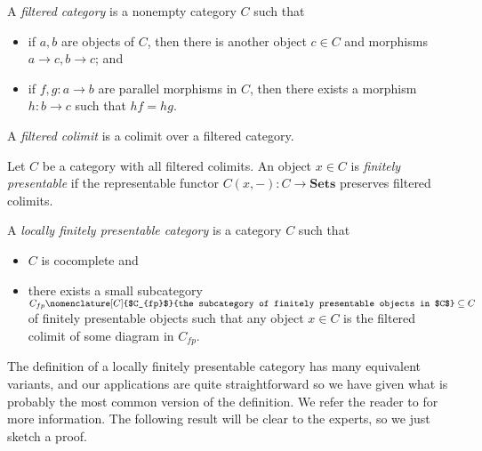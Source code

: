 \documentclass{amsbook} %
\newcommand{\cn}{\colon}
\newcommand{\mb}{\mathbf}
\numberwithin{section}{chapter}
\begin{document}
\begin{Defi}
A \textit{filtered category} is a nonempty category $C$ such that
\begin{itemize}
\item if $a,b$ are objects of $C$, then there is another object $c \in C$ and morphisms $a \to c, b \to c$; and
\item if $f,g \cn a \to b$ are parallel morphisms in $C$, then there exists a morphism $h \cn b \to c$ such that $hf = hg$.
\end{itemize}
\end{Defi}

\begin{Defi}
A \emph{filtered colimit} is a colimit over a filtered category.
\end{Defi}

\begin{Defi}
Let $C$ be a category with all filtered colimits.  An object $x \in C$ is \textit{finitely presentable} if the representable functor $C(x, -):C \rightarrow \mb{Sets}$ preserves filtered colimits.
\end{Defi}

\begin{Defi}
A \textit{locally finitely presentable category} is a category $C$ such that
\begin{itemize}
\item $C$ is cocomplete and
\item there exists a small subcategory $C_{fp}\nomenclature[C]{$C_{fp}$}{the subcategory of finitely presentable objects in $C$} \subseteq C$ of finitely presentable objects such that any object $x \in C$ is the filtered colimit of some diagram in $C_{fp}$.
\end{itemize}
\end{Defi}


The definition of a locally finitely presentable category has many equivalent variants, and our applications are quite straightforward so we have given what is probably the most common version of the definition.  We refer the reader to \cite{ar} for more information.  The following result will be clear to the experts, so we just sketch a proof.
\end{document}
